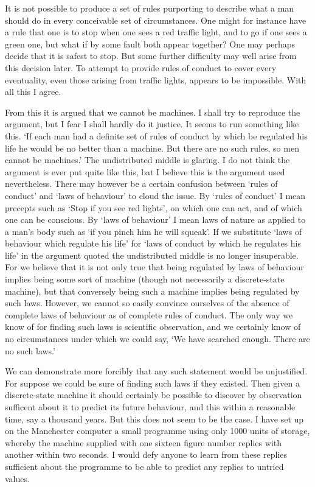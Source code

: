 \documentclass[12pt]{article}
\begin{document}
    It is not possible to produce a set of rules purporting to describe what a man should do in every conceivable set of circumstances. One might for instance have a rule that one is to stop when one sees a red traffic light, and to go if one sees a green one, but what if by some fault both appear together? One may perhaps decide that it is safest to stop. But some further difficulty may well arise from this decision later. To attempt to provide rules of conduct to cover every eventuality, even those arising from traffic lights, appears to be impossible. With all this I agree.

    From this it is argued that we cannot be machines. I shall try to reproduce the argument, but I fear I shall hardly do it justice. It seems to run something like this. ‘If each man had a definite set of rules of conduct by which be regulated his life he would be no better than a machine. But there are no such rules, so men cannot be machines.' The undistributed middle is glaring. I do not think the argument is ever put quite like this, bat I believe this is the argument used nevertheless. There may however be a certain confusion between ‘rules of conduct' and ‘laws of behaviour' to cloud the issue. By ‘rules of conduct' I mean precepts such as ‘Stop if you see red lights', on which one can act, and of which one can be conscious. By ‘laws of behaviour' I mean laws of nature as applied to a man's body such as ‘if you pinch him he will squeak'. If we substitute ‘laws of behaviour which regulate his life' for ‘laws of conduct by which he regulates his life' in the argument quoted the undistributed middle is no longer insuperable. For we believe that it is not only true that being regulated by laws of behaviour implies being some sort of machine (though not necessarily a discrete-state machine), but that conversely being such a machine implies being regulated by such laws. However, we cannot so easily convince ourselves of the absence of complete laws of behaviour as of complete rules of conduct. The only way we know of for finding such laws is scientific observation, and we certainly know of no circumstances under which we could say, ‘We have searched enough. There are no such laws.'

    We can demonstrate more forcibly that any such statement would be unjustified. For suppose we could be sure of finding such laws if they existed. Then given a discrete-state machine it should certainly be possible to discover by observation sufficent about it to predict its future behaviour, and this within a reasonable time, say a thousand years. But this does not seem to be the case. I have set up on the Manchester computer a small programme using only 1000 units of storage, whereby the machine supplied with one sixteen figure number replies with another within two seconds. I would defy anyone to learn from these replies sufficient about the programme to be able to predict any replies to untried values.
\end{document}
